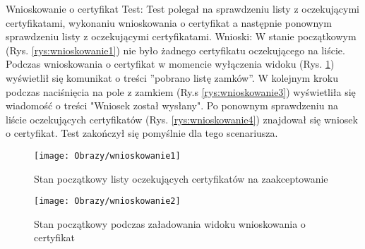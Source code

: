 \begin{enumerate*}
	\newpage

	\item Wnioskowanie o certyfikat\newline
	Test: Test polegał na sprawdzeniu listy z oczekującymi certyfikatami, wykonaniu wnioskowania o certyfikat a następnie ponownym sprawdzeniu listy z oczekującymi certyfikatami.\newline
	Wnioski: W stanie początkowym (Rys. \ref{rys:wnioskowanie1}) nie było żadnego certyfikatu oczekującego na liście. Podczas wnioskowania o certyfikat w momencie wyłączenia widoku (Rys. \ref{rys:wnioskowanie2}) wyświetlił się  komunikat o treści ''pobrano listę zamków''. W kolejnym kroku podczas naciśnięcia na pole z zamkiem (Ry.s \ref{rys:wnioskowanie3}) wyświetliła się wiadomość o treści "Wniosek został wysłany". Po ponownym sprawdzeniu na liście oczekujących certyfikatów (Rys. \ref{rys:wnioskowanie4}) znajdował się wniosek o certyfikat. Test zakończył się pomyślnie dla tego scenariusza.
	\begin{figure}[ht!]
		\centering
		\begin{minipage}{0.3\textwidth}
			\texttt{[image: Obrazy/wnioskowanie1]}
			\caption{Stan początkowy listy oczekujących certyfikatów na zaakceptowanie }
			\label{rys:wnioskowanie1}
		\end{minipage}
		\begin{minipage}{0.3\textwidth}
			\texttt{[image: Obrazy/wnioskowanie2]}
			\caption{Stan początkowy podczas załadowania widoku wnioskowania o certyfikat}
			\label{rys:wnioskowanie2}
		\end{minipage}
	

\end{figure}
\end{enumerate*}
